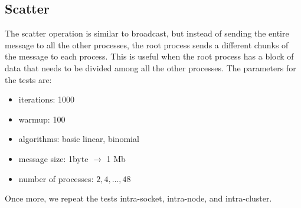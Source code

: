     

\subsection{Scatter}
    The scatter operation is similar to broadcast, but instead of sending
    the entire message to all the other processes, the root process
    sends a different chunks of the message to each process. This is useful
    when the root process has a block of data that needs to be divided
    among all the other processes.
    The parameters for the tests are:
    \begin{itemize}
        \item iterations: 1000
        \item warmup: 100
        \item algorithms: basic linear, binomial
        \item message size: 1byte $\rightarrow$ 1 Mb
        \item number of processes: $2, 4, \dots, 48$
    \end{itemize}
    Once more, we repeat the tests intra-socket, intra-node, and intra-cluster.
